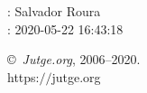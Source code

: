 \documentclass[11pt]{article}
\begin{document}
    \newcommand{\SampleTwoCol}{\SampleTwoColInputOutput{sample-1}{1}\SampleTwoColInputOutput{sample-2}{2}}
    \newcommand{\SampleOneCol}{\SampleOneColInputOutput{sample-1}{1}\SampleOneColInputOutput{sample-2}{2}}

    \ProblemInformation
    \Author: Salvador Roura\\    
    \Generation: 2020-05-22 16:43:18

    \bigskip

    \copyright\ \emph{Jutge.org}, 2006--2020. \\
    https:$/\!\!/$jutge.org
\end{document}
